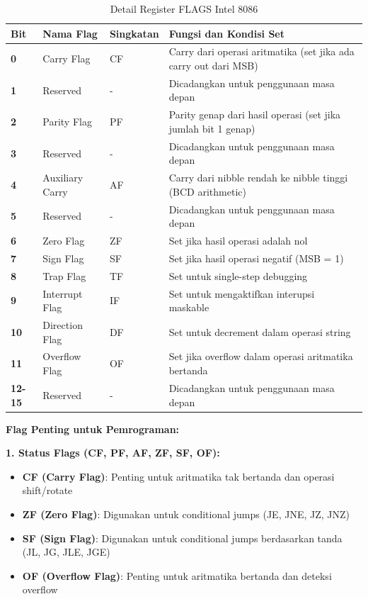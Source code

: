 \begin{table}[h]
\centering
\caption{Detail Register FLAGS Intel 8086}
\begin{tabular}{|p{2cm}|p{3cm}|p{2cm}|p{8cm}|}
\hline
\textbf{Bit} & \textbf{Nama Flag} & \textbf{Singkatan} & \textbf{Fungsi dan Kondisi Set} \\
\hline
\textbf{0} & Carry Flag & CF & Carry dari operasi aritmatika (set jika ada carry out dari MSB) \\
\hline
\textbf{1} & Reserved & - & Dicadangkan untuk penggunaan masa depan \\
\hline
\textbf{2} & Parity Flag & PF & Parity genap dari hasil operasi (set jika jumlah bit 1 genap) \\
\hline
\textbf{3} & Reserved & - & Dicadangkan untuk penggunaan masa depan \\
\hline
\textbf{4} & Auxiliary Carry & AF & Carry dari nibble rendah ke nibble tinggi (BCD arithmetic) \\
\hline
\textbf{5} & Reserved & - & Dicadangkan untuk penggunaan masa depan \\
\hline
\textbf{6} & Zero Flag & ZF & Set jika hasil operasi adalah nol \\
\hline
\textbf{7} & Sign Flag & SF & Set jika hasil operasi negatif (MSB = 1) \\
\hline
\textbf{8} & Trap Flag & TF & Set untuk single-step debugging \\
\hline
\textbf{9} & Interrupt Flag & IF & Set untuk mengaktifkan interupsi maskable \\
\hline
\textbf{10} & Direction Flag & DF & Set untuk decrement dalam operasi string \\
\hline
\textbf{11} & Overflow Flag & OF & Set jika overflow dalam operasi aritmatika bertanda \\
\hline
\textbf{12-15} & Reserved & - & Dicadangkan untuk penggunaan masa depan \\
\hline
\end{tabular}
\label{tab:flags-register-detail}
\end{table}

\textbf{Flag Penting untuk Pemrograman:}

\textbf{1. Status Flags (CF, PF, AF, ZF, SF, OF):}
\begin{itemize}
    \item \textbf{CF (Carry Flag)}: Penting untuk aritmatika tak bertanda dan operasi shift/rotate
    \item \textbf{ZF (Zero Flag)}: Digunakan untuk conditional jumps (JE, JNE, JZ, JNZ)
    \item \textbf{SF (Sign Flag)}: Digunakan untuk conditional jumps berdasarkan tanda (JL, JG, JLE, JGE)
    \item \textbf{OF (Overflow Flag)}: Penting untuk aritmatika bertanda dan deteksi overflow
\end{itemize}

